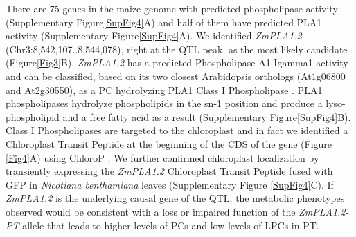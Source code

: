 \documentclass[9pt,twocolumn,twoside,lineno]{BioRxiv}
\begin{document}
There are 75 genes in the maize genome with predicted phospholipase activity (Supplementary Figure\ref{SupFig4}A) and half of them have predicted PLA1 activity (Supplementary Figure\ref{SupFig4}A).  
We identified \textit{ZmPLA1.2} (Chr3:8,542,107..8,544,078), right at the QTL peak, as the most likely candidate (Figure\ref{Fig3}B). 
\textit{ZmPLA1.2} has a predicted Phospholipase A1-Igamma1 activity and can be classified, based on its two closest Arabidopsis orthologs (At1g06800 and At2g30550), as a PC hydrolyzing PLA1 Class I Phospholipase \cite{Ryu2004-iv}. 
PLA1 phospholipases hydrolyze phospholipids in the sn-1 position and produce a lyso-phospholipid and a free fatty acid as a result (Supplementary Figure\ref{SupFig4}B). 
Class I Phospholipases are targeted to the chloroplast and in fact we identified a Chloroplast Transit Peptide at the beginning of the CDS of the gene (Figure \ref{Fig4}A) using ChloroP \cite{Emanuelsson1999-rs}. 
We further confirmed chloroplast localization by transiently expressing  the \textit{ZmPLA1.2} Chloroplast Transit Peptide fused with GFP in \textit{Nicotiana benthamiana} leaves (Supplementary Figure \ref{SupFig4}C).
If \textit{ZmPLA1.2} is the underlying causal gene of the QTL, the metabolic phenotypes observed would be consistent with a loss or impaired function of the \textit{ZmPLA1.2-PT} allele that leads to higher levels of PCs and low levels of LPCs in PT. 
\end{document}

